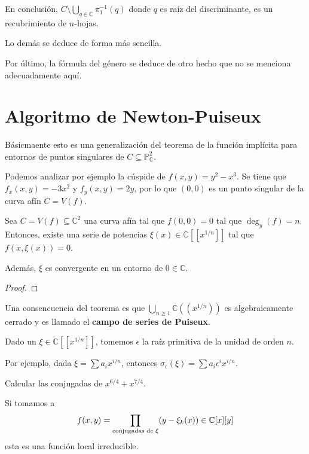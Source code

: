 \documentclass[12pt]{report}
\newcounter{it}
\theoremstyle{largebreak}
\begin{document}
    En conclusión, $C\setminus\bigcup_{ q\in\mathbb{C} }\pi_1^{-1}(q)$ donde $q$ es raíz del discriminante, es un recubrimiento de $n$-hojas.

    Lo demás se deduce de forma más sencilla.

    Por último, la fórmula del género se deduce de otro hecho que no se menciona adecuadamente aquí.

    \section{Algoritmo de Newton-Puiseux}

    Básicmaente esto es una generalización del teorema de la función implícita para entornos de puntos singulares de $C\subseteq\mathbb{P}^2_{\mathbb{C}}$.

    Podemos analizar por ejemplo la cúspide de $f(x,y)=y^2-x^3$. Se tiene que $f_x(x,y)=-3x^2$ y $f_y(x,y)=2y$, por lo que $(0,0)$ es un punto singular de la curva afín $C=V(f)$.

    \begin{theor}
        Sea $C=V(f)\subseteq\mathbb{C}^2$ una curva afín tal que $f(0,0)=0$ tal que $\deg_y(f)=n$. Entonces, existe una serie de potencias $\xi(x)\in\mathbb{C}[[x^{1/n}]]$ tal que $f(x,\xi(x))=0$.

        Además, $\xi$ es convergente en un entorno de $0\in\mathbb{C}$.
    \end{theor}

    \begin{proof}
        
    \end{proof}

    \begin{obs}
        Una consencuencia del teorema es que $\bigcup_{ n\geq1}\mathbb{C}((x^{1/n}))$ es algebraicamente cerrado y es llamado el \textbf{campo de series de Puiseux}.
    \end{obs}

    Dado un $\xi\in\mathbb{C}[[x^{1/n}]]$, tomemos $\epsilon$ la raíz primitiva de la unidad de orden $n$.

    Por ejemplo, dada $\xi=\sum a_ix^{i/n}$, entonces $\sigma_{\epsilon}(\xi)=\sum a_i\epsilon^ix^{ i/n}$.

    \begin{excer}
        Calcular las conjugadas de $x^{ 6/4}+x^{ 7/4}$.
    \end{excer}

    Si tomamos a
    \begin{equation*}
        f(x,y)=\prod_{ \textup{conjugadas de }\xi}(y-\xi_k(x))\in\mathbb{C}[x][y]
    \end{equation*}
    esta es una función local irreducible.
\end{document}
